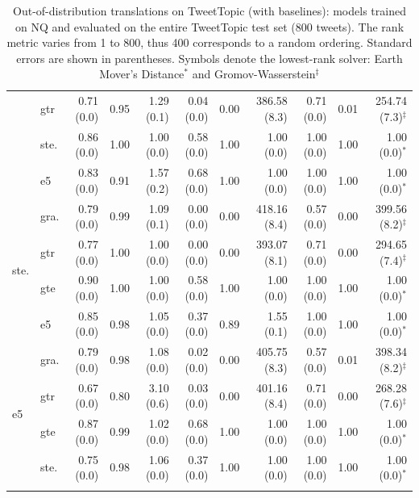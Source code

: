 \begin{table}[!ht]
\begin{tabular}{llrrrrrrrrr}
        & gtr & 0.71 {\tiny (0.0)} & 0.95 & 1.29 {\tiny (0.1)} & 0.04 {\tiny (0.0)} & 0.00 & 386.58 {\tiny (8.3)} & 0.71 {\tiny (0.0)} & 0.01 & 254.74 {\tiny (7.3)}$^{\ddagger}$ \\
        & ste. & 0.86 {\tiny (0.0)} & 1.00 & 1.00 {\tiny (0.0)} & 0.58 {\tiny (0.0)} & 1.00 & 1.00 {\tiny (0.0)} & 1.00 {\tiny (0.0)} & 1.00 & 1.00 {\tiny (0.0)}$^{*}$ \\
        & e5 & 0.83 {\tiny (0.0)} & 0.91 & 1.57 {\tiny (0.2)} & 0.68 {\tiny (0.0)} & 1.00 & 1.00 {\tiny (0.0)} & 1.00 {\tiny (0.0)} & 1.00 & 1.00 {\tiny (0.0)}$^{*}$ \\
        \midrule
        \multirow{4}{*}{ste.} & gra. & 0.79 {\tiny (0.0)} & 0.99 & 1.09 {\tiny (0.1)} & 0.00 {\tiny (0.0)} & 0.00 & 418.16 {\tiny (8.4)} & 0.57 {\tiny (0.0)} & 0.00 & 399.56 {\tiny (8.2)}$^\ddagger$ \\
        & gtr & 0.77 {\tiny (0.0)} & 1.00 & 1.00 {\tiny (0.0)} & 0.00 {\tiny (0.0)} & 0.00 & 393.07 {\tiny (8.1)} & 0.71 {\tiny (0.0)} & 0.00 & 294.65 {\tiny (7.4)}$^{\ddagger}$ \\
        & gte & 0.90 {\tiny (0.0)} & 1.00 & 1.00 {\tiny (0.0)} & 0.58 {\tiny (0.0)} & 1.00 & 1.00 {\tiny (0.0)} & 1.00 {\tiny (0.0)} & 1.00 & 1.00 {\tiny (0.0)}$^{*}$ \\
        & e5 & 0.85 {\tiny (0.0)} & 0.98 & 1.05 {\tiny (0.0)} & 0.37 {\tiny (0.0)} & 0.89 & 1.55 {\tiny (0.1)} & 1.00 {\tiny (0.0)} & 1.00 & 1.00 {\tiny (0.0)}$^{*}$ \\
        \midrule
        \multirow{4}{*}{e5} & gra. & 0.79 {\tiny (0.0)} & 0.98 & 1.08 {\tiny (0.0)} & 0.02 {\tiny (0.0)} & 0.00 & 405.75 {\tiny (8.3)} & 0.57 {\tiny (0.0)} & 0.01 & 398.34 {\tiny (8.2)}$^\ddagger$ \\
        & gtr & 0.67 {\tiny (0.0)} & 0.80 & 3.10 {\tiny (0.6)} & 0.03 {\tiny (0.0)} & 0.00 & 401.16 {\tiny (8.4)} & 0.71 {\tiny (0.0)} & 0.00 & 268.28 {\tiny (7.6)}$^{\ddagger}$ \\
        & gte & 0.87 {\tiny (0.0)} & 0.99 & 1.02 {\tiny (0.0)} & 0.68 {\tiny (0.0)} & 1.00 & 1.00 {\tiny (0.0)} & 1.00 {\tiny (0.0)} & 1.00 & 1.00 {\tiny (0.0)}$^{*}$ \\
        & ste. & 0.75 {\tiny (0.0)} & 0.98 & 1.06 {\tiny (0.0)} & 0.37 {\tiny (0.0)} & 1.00 & 1.00 {\tiny (0.0)} & 1.00 {\tiny (0.0)} & 1.00 & 1.00 {\tiny (0.0)}$^{*}$ \\
        \bottomrule\\[-1.6ex]
    \end{tabular}
    \caption{Out-of-distribution translations on TweetTopic (with baselines): \atk{} models trained on NQ and evaluated on the entire TweetTopic test set (800 tweets). The rank metric varies from 1 to 800, thus 400 corresponds to a random ordering. Standard errors are shown in parentheses. Symbols denote the lowest-rank solver: Earth Mover's Distance$^*$ and Gromov-Wasserstein$^\ddagger$}
    \label{tab:embedding_comparison_ood}
\end{table}

